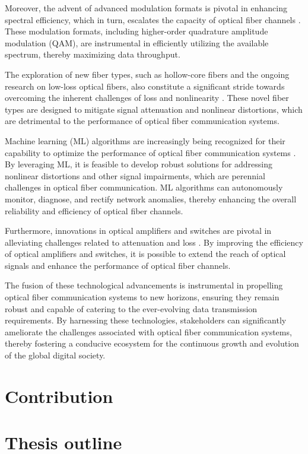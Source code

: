 Moreover, the advent of advanced modulation formats is pivotal in enhancing spectral efficiency, which in turn, escalates the capacity of optical fiber channels \cite{huawei2023}. These modulation formats, including higher-order quadrature amplitude modulation (QAM), are instrumental in efficiently utilizing the available spectrum, thereby maximizing data throughput.

The exploration of new fiber types, such as hollow-core fibers and the ongoing research on low-loss optical fibers, also constitute a significant stride towards overcoming the inherent challenges of loss and nonlinearity \cite{engineering2023}. These novel fiber types are designed to mitigate signal attenuation and nonlinear distortions, which are detrimental to the performance of optical fiber communication systems.

Machine learning (ML) algorithms are increasingly being recognized for their capability to optimize the performance of optical fiber communication systems \cite{ieee_ml_2022}. By leveraging ML, it is feasible to develop robust solutions for addressing nonlinear distortions and other signal impairments, which are perennial challenges in optical fiber communication. ML algorithms can autonomously monitor, diagnose, and rectify network anomalies, thereby enhancing the overall reliability and efficiency of optical fiber channels.

Furthermore, innovations in optical amplifiers and switches are pivotal in alleviating challenges related to attenuation and loss \cite{engineering2023}. By improving the efficiency of optical amplifiers and switches, it is possible to extend the reach of optical signals and enhance the performance of optical fiber channels.

The fusion of these technological advancements is instrumental in propelling optical fiber communication systems to new horizons, ensuring they remain robust and capable of catering to the ever-evolving data transmission requirements. By harnessing these technologies, stakeholders can significantly ameliorate the challenges associated with optical fiber communication systems, thereby fostering a conducive ecosystem for the continuous growth and evolution of the global digital society.





\section*{Contribution}

\lipsum[1]

\section*{Thesis outline}

\lipsum[1]

